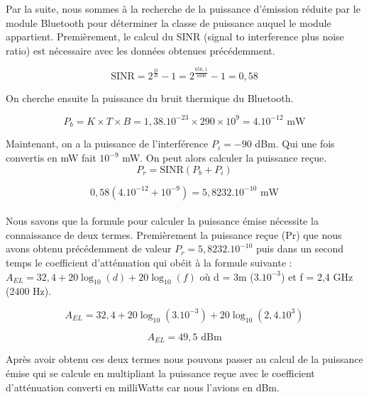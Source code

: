 \documentclass[12]{article}
\begin{document}
Par la suite, nous sommes à la recherche de la puissance d'émission réduite par le module Bluetooth pour déterminer la classe de puissance auquel le module appartient. Premièrement, le calcul du SINR (signal to interference plus noise ratio) est nécessaire avec les données obtenues précédemment. 


\begin{equation*}
    \text{SINR} = 2^{\frac{D}{B}} - 1 =  2^{\frac{656,1}{1000}} - 1 = 0,58
\end{equation*}

On cherche ensuite la puissance du bruit thermique du Bluetooth. 

\begin{equation*}
    P_b = K \times T \times B = 1,38.10^{-23} \times 290 \times 10^9 = 4.10^{-12} \text{ mW}
\end{equation*}

Maintenant, on a la puissance de l'interférence $P_i = -90$ dBm. Qui une fois convertis en mW fait $10^{-9}$ mW. On peut alors calculer la puissance reçue.\\

\begin{equation*}
    P_r = \text{SINR} \left( P_b + P_i \right)
\end{equation*}

\begin{equation*}
    0,58 \left( 4.10^{-12} + 10^{-9} \right) = 5,8232.10^{-10} \text{ mW}
\end{equation*}
\\

Nous savons que la formule pour calculer la puissance émise nécessite la connaissance de deux termes. Premièrement la puissance reçue (Pr) que nous avons obtenu précédemment de valeur $P_r = 5,8232.10^{-10}$ puis dans un second temps le coefficient d'atténuation qui obéit à la formule suivante : $A_{EL} = 32,4 + 20 \log_{10} \left( d \right) + 20 \log_{10} \left( f \right) $ où d = 3m ($3.10^{-3}$) et f = 2,4 GHz (2400 Hz). 

\begin{equation*}
    A_{EL} = 32,4 + 20 \log_{10} \left( 3.10^{-3} \right) + 20 \log_{10} \left( 2,4.10^{3} \right)
\end{equation*}
    
\begin{equation*}
    A_{EL} = 49,5 \text{ dBm}
\end{equation*}

Après avoir obtenu ces deux termes nous pouvons passer au calcul de la puissance émise qui se calcule en multipliant la puissance reçue avec le coefficient d'atténuation converti en milliWatts car nous l'avions en dBm. 
\end{document}
